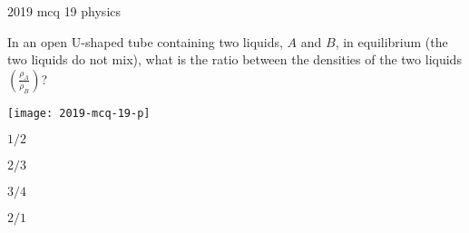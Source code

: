 \ylDisplay
{}%
{2019}%
{mcq}%
{19}%
{physics}%
{}%
{
\ifStatement
In an open U-shaped tube containing two liquids, $A$ and $B$, in equilibrium (the two liquids do not mix), what is the ratio between the densities of the two  liquids $\left(\frac{\rho_A}{\rho_B}\right)$?
\begin{center}
  \texttt{[image: 2019-mcq-19-p]}
\end{center}

\fi


$1/2$
\fi


$2/3$
\fi


$3/4$
\fi


$2/1$
\fi


\ifHint

\fi


\ifSolution

\fi


\ifEstStatement

\fi



\fi



\fi



\fi



\fi


\ifEstHint

\fi


\ifEstSolution

\fi
}
